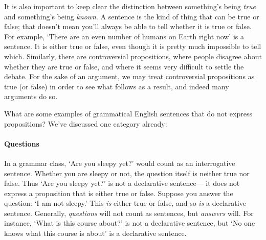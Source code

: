 
It is also important to keep clear the distinction between something's being \emph{true} and something's being \emph{known}.
A sentence is the kind of thing that can be true or false; that doesn't mean you'll always be able to tell whether it is true or false.
For example, `There are an even number of humans on Earth right now' is a sentence.
It is either true or false, even though it is pretty much impossible to tell which.
Similarly, there are controversial propositions, where people disagree about whether they are true or false, and where it seems very difficult to settle the debate.
For the sake of an argument, we may treat controversial propositions as true (or false) in order to see what follows as a result, and indeed many arguments do so. 

What are some examples of grammatical English sentences that do not express propositions?
We've discussed one category already:

\paragraph{Questions} In a grammar class, `Are you sleepy yet?' would count as an interrogative sentence.
Whether you are sleepy or not, the question itself is neither true nor false.
Thus `Are you sleepy yet?' is not a declarative sentence--- it does not express a proposition that is either true or false.
Suppose you answer the question: `I am not sleepy.'
This \emph{is} either true or false, and so \emph{is} a declarative sentence.
Generally, \emph{questions} will not count as sentences, but \emph{answers} will. 
For instance, `What is this course about?' is not a declarative sentence, but `No one knows what this course is about' is a declarative sentence.

